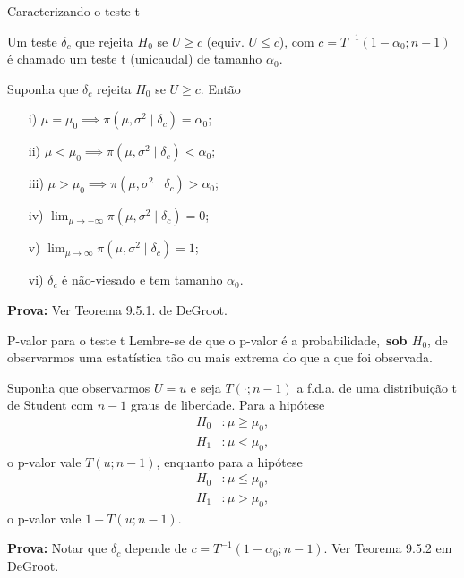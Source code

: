 \begin{frame}{Caracterizando o teste t}
\begin{defn}[Teste t]
Um teste $\delta_c$ que rejeita $H_0$ se $U\geq c$ (equiv. $U \leq c$), com $c = T^{-1}(1-\alpha_0; n-1)$ é chamado um teste t (unicaudal) de tamanho $\alpha_0$.
\end{defn}
\begin{theo}
Suponha que $\delta_c$ rejeita $H_0$ se $U\geq c$.
Então
\begin{itemize}
 \item [i)] $\mu = \mu_0 \implies \pi(\mu, \sigma^2 \mid \delta_c) = \alpha_0$;
 \item [ii)] $\mu < \mu_0 \implies \pi(\mu, \sigma^2 \mid \delta_c) < \alpha_0$;
 \item [iii)] $\mu > \mu_0 \implies \pi(\mu, \sigma^2 \mid \delta_c) > \alpha_0$;
 \item [iv)] $\lim_{\mu \to -\infty}  \pi(\mu, \sigma^2 \mid \delta_c) = 0$;
 \item [v)] $\lim_{\mu \to \infty}  \pi(\mu, \sigma^2 \mid \delta_c) = 1$;
 \item [vi)] $\delta_c$ é não-viesado e tem tamanho $\alpha_0$.
\end{itemize}
\end{theo}
\textbf{Prova:} Ver Teorema 9.5.1. de DeGroot. 
\end{frame}

\begin{frame}{P-valor para o teste t}
 Lembre-se de que o p-valor é a probabilidade,~\textbf{sob $H_0$}, de observarmos uma estatística tão ou mais extrema do que a que foi observada.
 \begin{theo}
 Suponha que observarmos $U = u$ e seja $T(\cdot; n-1)$ a f.d.a. de uma distribuição t de Student com $n-1$ graus de liberdade.
 Para a hipótese
\begin{align*}
   H_0 &: \mu \geq \mu_0, \\
   H_1&:  \mu < \mu_0,
  \end{align*}
o p-valor vale $T(u;n-1)$, enquanto para a hipótese
\begin{align*}
   H_0 &: \mu \leq \mu_0, \\
   H_1&:  \mu > \mu_0,
  \end{align*}
o p-valor vale $1-T(u; n-1)$.   
 \end{theo}
 \textbf{Prova:} Notar que $\delta_c$ depende de $c = T^{-1}(1-\alpha_0; n-1)$.
Ver Teorema 9.5.2 em DeGroot. 
\end{frame}

